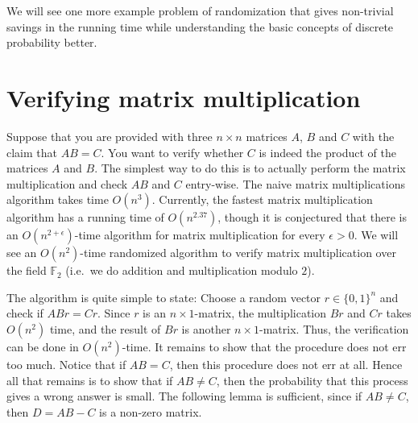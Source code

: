 We will see one more example problem of randomization that gives non-trivial savings in the running time while understanding the basic concepts of discrete probability better.

\section{Verifying matrix multiplication}

Suppose that you are provided with three $n\times n$ matrices $A$, $B$ and $C$ with the claim that $AB = C$. You want to verify whether $C$ is indeed the product of the matrices $A$ and $B$. The simplest way to do this is to actually perform the matrix multiplication and check $AB$ and $C$ entry-wise. The naive matrix multiplications algorithm takes time $O(n^3)$. Currently, the fastest matrix multiplication algorithm has a running time of $O(n^{2.37})$, though it is conjectured that there is an $O(n^{2+\epsilon})$-time algorithm for matrix multiplication for every $\epsilon > 0$. We will see an $O(n^2)$-time randomized algorithm to verify matrix multiplication over the field $\mathbb{F}_2$ (i.e.\ we do addition and multiplication modulo $2$).

The algorithm is quite simple to state: Choose a random vector $r \in \{0,1\}^n$ and check if $ABr = Cr$. Since $r$ is an $n\times 1$-matrix, the multiplication $Br$ and $Cr$ takes $O(n^2)$ time, and the result of $Br$ is another $n\times 1$-matrix. Thus, the verification can be done in $O(n^2)$-time. It remains to show that the procedure does not err too much. Notice that if $AB=C$, then this procedure does not err at all. Hence all that remains is to show that if $AB\neq C$, then the probability that this process gives a wrong answer is small. The following lemma is sufficient, since if $AB \neq C$, then $D=AB-C$ is a non-zero matrix.

